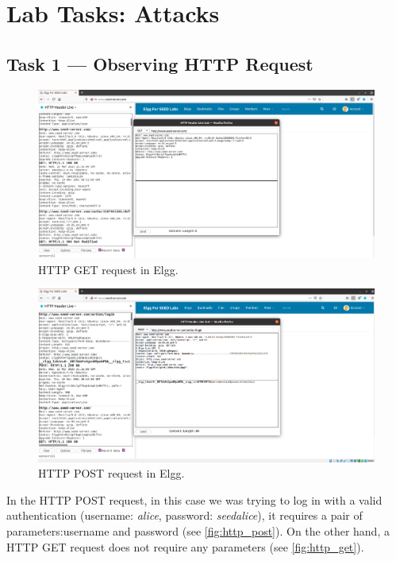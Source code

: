 \section{Lab Tasks: Attacks}
\subsection{Task 1 --- Observing HTTP Request}
%
\begin{figure}
    \centering
    \includegraphics[width=\textwidth,height=\textheight,keepaspectratio]
    {figures/HTTP_GET.png}
    \caption{HTTP GET request in Elgg.}\label{fig:http_get}
\end{figure}

\begin{figure}
    \centering
    \includegraphics[width=\textwidth,height=\textheight,keepaspectratio]
    {figures/HTTP_POST.png}
    \caption{HTTP POST request in Elgg.}\label{fig:http_post}
\end{figure}

In the HTTP POST request, in this case we was trying to log in with a valid
authentication (username: \emph{alice}, password: \emph{seedalice}), it requires
a pair of parameters:{\selectfont username} and
{\selectfont password} (see \autoref{fig:http_post}).
On the other hand, a HTTP GET request does not require any parameters
(see \autoref{fig:http_get}).